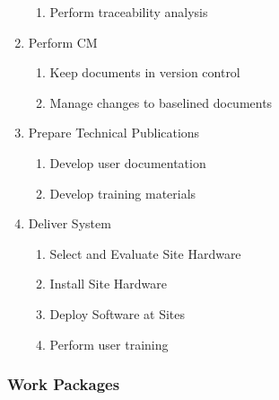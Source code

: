 \documentclass[11pt]{article}
\begin{document}
\begin{enumerate}
\begin{enumerate}
  \item Perform traceability analysis
  \end{enumerate}
\item Perform CM
  \begin{enumerate}
  \item Keep documents in version control
  \item Manage changes to baselined documents
  \end{enumerate}
\item Prepare Technical Publications
  \begin{enumerate}
  \item Develop user documentation
  \item Develop training materials
  \end{enumerate}
\item Deliver System
  \begin{enumerate}
  \item Select and Evaluate Site Hardware
  \item Install Site Hardware
  \item Deploy Software at Sites
  \item Perform user training
  \end{enumerate}
\end{enumerate}


\subsubsection{Work Packages}
\end{document}
